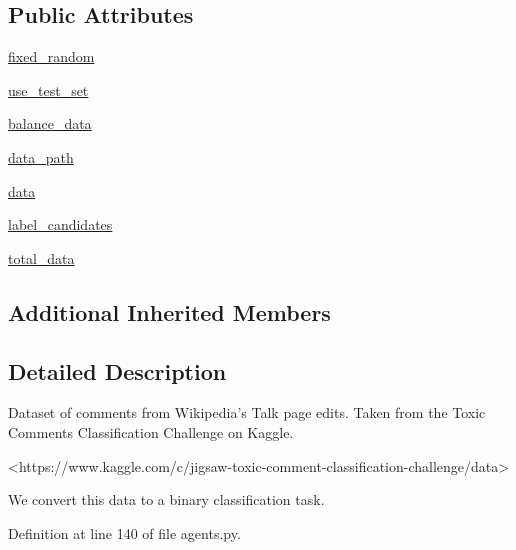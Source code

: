 \subsection*{Public Attributes}
\begin{DoxyCompactItemize}
\item 
\hyperlink{classparlai_1_1tasks_1_1dialogue__safety_1_1agents_1_1WikiToxicCommentsTeacher_a0a82908d2bd950c6bc497f6e095b06b7}{fixed\+\_\+random}
\item 
\hyperlink{classparlai_1_1tasks_1_1dialogue__safety_1_1agents_1_1WikiToxicCommentsTeacher_ad43ba64edd570e5fb5e4a4a0a68865cf}{use\+\_\+test\+\_\+set}
\item 
\hyperlink{classparlai_1_1tasks_1_1dialogue__safety_1_1agents_1_1WikiToxicCommentsTeacher_a9eeb881196ce42d8994dc4884fd9113a}{balance\+\_\+data}
\item 
\hyperlink{classparlai_1_1tasks_1_1dialogue__safety_1_1agents_1_1WikiToxicCommentsTeacher_a004f00e27fe4d6f437edab31e99018f5}{data\+\_\+path}
\item 
\hyperlink{classparlai_1_1tasks_1_1dialogue__safety_1_1agents_1_1WikiToxicCommentsTeacher_acfbf40cbf6be048c6667f4712e1db5c3}{data}
\item 
\hyperlink{classparlai_1_1tasks_1_1dialogue__safety_1_1agents_1_1WikiToxicCommentsTeacher_a81bfea7e10ad4273964a26599dcce45d}{label\+\_\+candidates}
\item 
\hyperlink{classparlai_1_1tasks_1_1dialogue__safety_1_1agents_1_1WikiToxicCommentsTeacher_a027ef2d3141fc6e055b17f3ce7a3c7c5}{total\+\_\+data}
\end{DoxyCompactItemize}
\subsection*{Additional Inherited Members}


\subsection{Detailed Description}
\begin{DoxyVerb}Dataset of comments from Wikipedia's Talk page edits. Taken from the Toxic Comments
Classification Challenge on Kaggle.

<https://www.kaggle.com/c/jigsaw-toxic-comment-classification-challenge/data>

We convert this data to a binary classification task.
\end{DoxyVerb}
 

Definition at line 140 of file agents.\+py.



